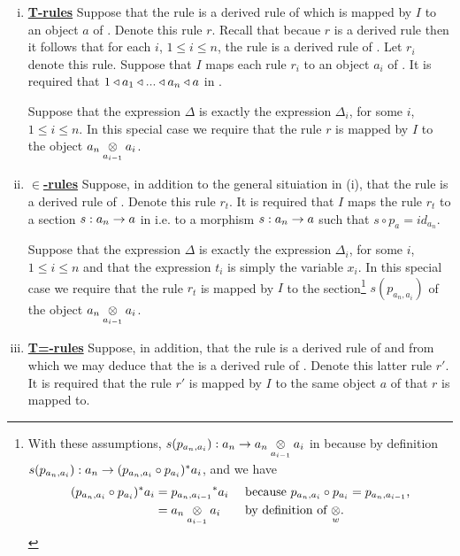 \begin{enumerate}[(i)]
\setlength\itemindent{2cm}
\item \underline{\textbf{T-rules}} 
Suppose that  the rule
 is a derived rule of \gatUw which is mapped by $I$ to an object $a$ of \catc. Denote this rule $r$. Recall that becaue $r$ is a derived rule then it follows  that for each $i$, 
$1 \leq i \leq n$, the rule  is a derived rule of \gatU. Let $r_i$ denote this rule.
Suppose that $I$ maps each rule $r_i$ to an object $a_i$ of \catcw.
It is required that $1 \base a_1 \base ... \base a_n \base a$ in \catc.

Suppose that the  expression $\Delta$ is exactly the expression $\Delta_i$, for some $i$, $1 \leq i \leq n$. In this special case we require that the rule $r$  is mapped by $I$ to the object 
$\crossx{a_n}{a_i}{a_{i-1}}$. 

\item \underline{\textbf{$\boldsymbol {\in}$-rules}} 
Suppose, in addition to the general situiation in (i),  that the rule
 is a  derived rule of \gatU. 
Denote this rule $r_t$. It is required that $I$ maps the rule $r_t$ to a section
 $s:a_n \morph a$ in \catcw i.e. to a morphism $s:a_n \morph a$ such that $s \circ p_a = id_{a_n}$. 

Suppose that the  expression $\Delta$ is exactly the expression $\Delta_i$, for some $i$, $1 \leq i \leq n$ and that the expression $t_i$ is simply the variable $x_i$. 
In this special case we require that the rule $r_t$  is mapped by $I$ to the section\footnote{
With these assumptions, $s(p_{a_n,a_i}): a_n \morph \crossx{a_n}{a_i}{a_{i-1}}$ in \catcw because by definition  $s(p_{a_n,a_i}): a_n  \morph (p_{a_n,a_i} \circ p_{a_i})^*a_i$,
and we have 
\begin{align*}
(p_{a_n,a_i} \circ p_{a_i})^*a_i &= {p_{a_n,a_{i-1}}} ^* a_i  && \mbox{ because $p_{a_n,a_i} \circ p_{a_i}=p_{a_n,a_{i-1}}$,} \\
                                 &= \crossx{a_n}{a_i}{a_{i-1}} && \mbox{ by definition of $\crossx{}{}{w}$}.
\end{align*}
} %
$s(p_{a_n,a_i})$ of the object $\crossx{a_n}{a_i}{a_{i-1}}$. 

\item \underline{\textbf{T=-rules}} 
Suppose, in addition, that  the rule  is a derived rule of \gatUw and
from which we may deduce that the
 is a derived rule of \gatU. Denote this latter rule $r'$.
It is required that the rule $r'$ is mapped by $I$ to the same object $a$ of \catcw that $r$ is mapped to.


\end{enumerate}

